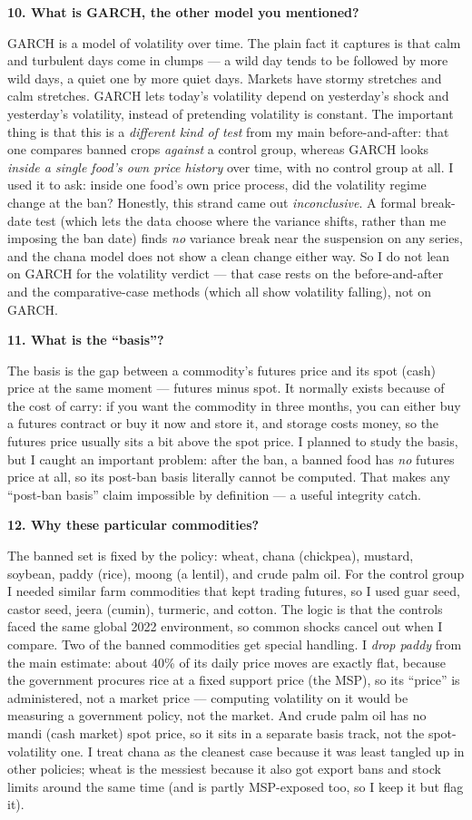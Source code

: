 \documentclass[11pt]{article}
\newcommand{\Q}[1]{\medskip\noindent\textbf{#1}\par}
\newcommand{\A}{\noindent}
\begin{document}
\Q{10. What is GARCH, the other model you mentioned?}
\A GARCH is a model of volatility over time. The plain fact it captures is that calm and turbulent
days come in clumps --- a wild day tends to be followed by more wild days, a quiet one by more quiet
days. Markets have stormy stretches and calm stretches. GARCH lets today's volatility depend on
yesterday's shock and yesterday's volatility, instead of pretending volatility is constant. The
important thing is that this is a \emph{different kind of test} from my main before-and-after: that
one compares banned crops \emph{against} a control group, whereas GARCH looks \emph{inside a single
food's own price history} over time, with no control group at all. I used it to ask: inside one
food's own price process, did the volatility regime change at the ban? Honestly, this strand came
out \emph{inconclusive}. A formal break-date test (which lets the data choose where the variance
shifts, rather than me imposing the ban date) finds \emph{no} variance break near the suspension on
any series, and the chana model does not show a clean change either way. So I do not lean on GARCH
for the volatility verdict --- that case rests on the before-and-after and the comparative-case
methods (which all show volatility falling), not on GARCH.

\Q{11. What is the ``basis''?}
\A The basis is the gap between a commodity's futures price and its spot (cash) price at the same
moment --- futures minus spot. It normally exists because of the cost of carry: if you want the
commodity in three months, you can either buy a futures contract or buy it now and store it, and
storage costs money, so the futures price usually sits a bit above the spot price. I planned to study
the basis, but I caught an important problem: after the ban, a banned food has \emph{no} futures
price at all, so its post-ban basis literally cannot be computed. That makes any ``post-ban basis''
claim impossible by definition --- a useful integrity catch.

\Q{12. Why these particular commodities?}
\A The banned set is fixed by the policy: wheat, chana (chickpea), mustard, soybean, paddy (rice),
moong (a lentil), and crude palm oil. For the control group I needed similar farm commodities that
kept trading futures, so I used guar seed, castor seed, jeera (cumin), turmeric, and cotton. The
logic is that the controls faced the same global 2022 environment, so common shocks cancel out when
I compare. Two of the banned commodities get special handling. I \emph{drop paddy} from the main
estimate: about 40\% of its daily price moves are exactly flat, because the government procures rice
at a fixed support price (the MSP), so its ``price'' is administered, not a market price --- computing
volatility on it would be measuring a government policy, not the market. And crude palm oil has no
mandi (cash market) spot price, so it sits in a separate basis track, not the spot-volatility one. I
treat chana as the cleanest case because it was least tangled up in other policies; wheat is the
messiest because it also got export bans and stock limits around the same time (and is partly
MSP-exposed too, so I keep it but flag it).
\end{document}
